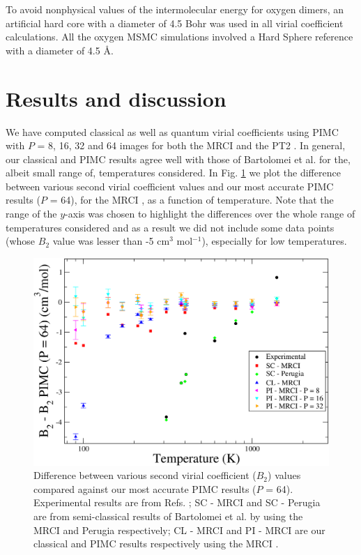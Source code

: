     To avoid nonphysical values of the intermolecular energy for oxygen dimers, an artificial hard core with a diameter of 4.5 Bohr was used in all virial coefficient calculations. All the oxygen MSMC simulations involved a Hard Sphere reference with a diameter of 4.5 \AA.
\section{Results and discussion}
    We have computed classical as well as quantum virial coefficients using PIMC with $P$ = 8, 16, 32 and 64 images for both the MRCI and the PT2 \PESs{}. In general, our classical and PIMC results agree well with those of Bartolomei et al. \cite{Bartolomei2010} for the, albeit small range of, temperatures considered. In Fig. \ref{fig:B2O2AllDiffMRCI} we plot the difference between various second virial coefficient values and our most accurate PIMC results ($P$ = 64), for the MRCI \PESs{}, as a function of temperature. Note that the range of the $y$-axis was chosen to highlight the differences over the whole range of temperatures considered and as a result we did not include some data points (whose $B_2$ value was lesser than -5 cm$^3$ mol$^{-1}$), especially for low temperatures. 
    \begin{figure}[!htbp]
        \centering
        \includegraphics[scale=0.20,keepaspectratio]{Chapter-6/Figures/B2O2AllDiffMRCI.png}
        \caption{Difference between various second virial coefficient ($B_2$) values compared against our most accurate PIMC results ($P$ = 64). Experimental results are from Refs. \cite{Bartolomei2010,Dymond}; SC - MRCI and SC - Perugia are from semi-classical results of Bartolomei et al. \cite{Bartolomei2010} by using the MRCI and Perugia \PESs{} \cite{Aquilanti1999} respectively; CL - MRCI and PI - MRCI are our classical and PIMC results respectively using the MRCI \PESs{}.}
        \label{fig:B2O2AllDiffMRCI}
    \end{figure}

